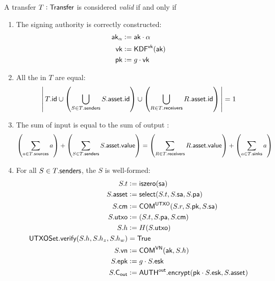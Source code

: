 \begin{definition}\label{def:transfer-validity-statement}
    A transfer $T : {\textsf{Transfer}}$ is considered \emph{valid} if and only if
    \begin{enumerate}
        \item The signing authority is correctly constructed:
            \begin{align*}
                {\textsf{ak}}_\alpha &:= {\textsf{ak}} \cdot \alpha \\
                {\textsf{vk}}        &:= {\textsf{KDF}}^{{\textsf{vk}}}({\textsf{ak}}) \\
                {\textsf{pk}}        &:= g \cdot {\textsf{vk}}
            \end{align*}
        \item All the  in $T$ are equal:
            \[
                \left|\,
                    T.{\textsf{id}}
                    \cup
                    \left(\bigcup_{S \in T.{\textsf{senders}}} S.{\textsf{asset}}.{\textsf{id}} \right)
                    \cup
                    \left(\bigcup_{R \in T.{\textsf{receivers}}} R.{\textsf{asset}}.{\textsf{id}} \right)
                \,\right| = 1
            \]
        \item The sum of input  is equal to the sum of output :
            \[
                \left(\sum_{a \in T.{\textsf{sources}}} a\right)
                +
                \left(\sum_{S \in T.{\textsf{senders}}} S.{\textsf{asset}}.{\textsf{value}}\right)
                =
                \left(\sum_{R \in T.{\textsf{receivers}}} R.{\textsf{asset}}.{\textsf{value}}\right)
                +
                \left(\sum_{a \in T.{\textsf{sinks}}} a\right)
            \]
        \item For all $S \in T.{\textsf{senders}}$, the \Sender{} $S$ is well-formed:
            \begin{align*}
                S.t     &:= {\textsf{iszero}}({\textsf{sa}}) \\
                S.{\textsf{asset}} &:= {\textsf{select}}(S.t, S.{\textsf{sa}}, S.{\textsf{pa}}) \\
                S.{\textsf{cm}}   &:= {\textsf{COM}}^{{\textsf{UTXO}}}(S.r, S.{\textsf{pk}}, S.{\textsf{sa}}) \\
                S.{\textsf{utxo}} &:= (S.t, S.{\textsf{pa}}, S.{\textsf{cm}}) \\
                S.h     &:= H(S.{\textsf{utxo}}) \\
                {\textsf{UTXOSet}}.{\textsf{verify}}(S.h, S.h_z, S.h_w) &= {\textsf{True}} \\
                S.{\textsf{vn}}   &:= {\textsf{COM}}^{{\textsf{VN}}}({\textsf{ak}}, S.h) \\
                S.{\textsf{epk}}  &:= g \cdot S.{\textsf{esk}} \\
                S.{\textsf{C}_\textsf{out}} &:= {{\textsf{AUTH}}^\textsf{out}}.{\textsf{encrypt}}({\textsf{pk}} \cdot S.{\textsf{esk}}, S.{\textsf{asset}})
            \end{align*}

\end{enumerate}
\end{definition}
